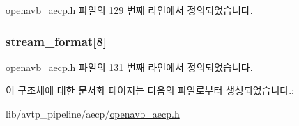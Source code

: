 openavb\+\_\+aecp.\+h 파일의 129 번째 라인에서 정의되었습니다.

\subsubsection[{\texorpdfstring{stream\+\_\+format}{stream_format}}]{ stream\+\_\+format\mbox{[}8\mbox{]}}\hypertarget{structopenavb__aecp__response__data__get__stream__format__t_a574c1a5d46fe953da8f394d622e1da8e}{}\label{structopenavb__aecp__response__data__get__stream__format__t_a574c1a5d46fe953da8f394d622e1da8e}


openavb\+\_\+aecp.\+h 파일의 131 번째 라인에서 정의되었습니다.



이 구조체에 대한 문서화 페이지는 다음의 파일로부터 생성되었습니다.\+:\begin{DoxyCompactItemize}
\item 
lib/avtp\+\_\+pipeline/aecp/\hyperlink{openavb__aecp_8h}{openavb\+\_\+aecp.\+h}\end{DoxyCompactItemize}
